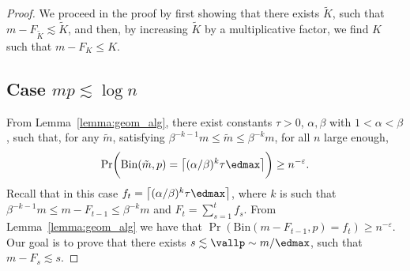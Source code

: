 \begin{proof}
We proceed in the proof by first showing that there exists \(\tilde K\), such that \(m - F_{\tilde K} \lesssim \tilde K\), and then, by increasing \(\tilde K\) by a multiplicative factor, we find \(K\) such that \(m - F_K \leq K\).
\subsection*{Case \(mp \lesssim \log n\)} 
From Lemma~\ref{lemma:geom_alg}, there exist constants \(\tau > 0\), \(\alpha, \beta\) with \(1 < \alpha < \beta\), such that, for any \(\tilde m\), satisfying \(\beta^{-k-1}m \leq \tilde m \leq \beta^{-k} m\), for all \(n\) large enough,
    \begin{equation*}
        \Pr\biggl(\mathrm{Bin}(\tilde m, p) = \bigl\lceil (\alpha / \beta)^{k} \tau \edmax\bigr\rceil \biggr) \geq n^{-\varepsilon}.
    \end{equation*}
Recall that in this case \(f_t  = \bigl\lceil (\alpha / \beta)^{k} \tau \edmax\bigr\rceil\), where \(k\) is such that \(\beta^{-k-1}m \leq m - F_{t-1} \leq \beta^{-k} m\) and \(F_t = \sum_{s = 1}^t f_s\). From Lemma~\ref{lemma:geom_alg} we have that \(\Pr(\mathrm{Bin}(m - F_{t-1}, p) = f_t) \geq n^{-\varepsilon}\). Our goal is to prove that there exists \(s \lesssim \vallp \sim m / \edmax\), such that \(m - F_s \lesssim s\). 


\end{proof}
